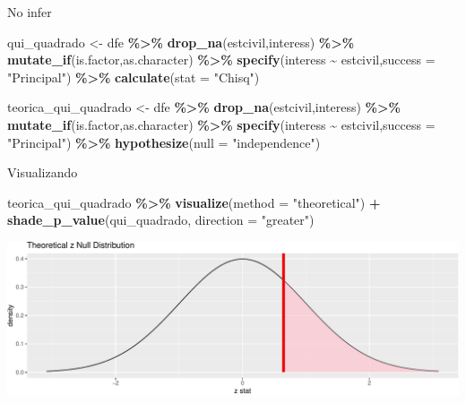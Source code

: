 \documentclass[
  9pt,
  ignorenonframetext,
  aspectratio=169]{beamer}
\newenvironment{Shaded}{\begin{snugshade}}{\end{snugshade}}
\newcommand{\DataTypeTok}[1]{\textcolor[rgb]{0.13,0.29,0.53}{#1}}
\newcommand{\KeywordTok}[1]{\textcolor[rgb]{0.13,0.29,0.53}{\textbf{#1}}}
\newcommand{\NormalTok}[1]{#1}
\newcommand{\OperatorTok}[1]{\textcolor[rgb]{0.81,0.36,0.00}{\textbf{#1}}}
\newcommand{\StringTok}[1]{\textcolor[rgb]{0.31,0.60,0.02}{#1}}
\begin{document}
\begin{frame}[fragile]{No infer}
\protect\hypertarget{no-infer}{}
\begin{Shaded}
\begin{Highlighting}[]
\NormalTok{qui\_quadrado \textless{}{-}}\StringTok{ }\NormalTok{dfe }\OperatorTok{\%\textgreater{}\%}\StringTok{ }\KeywordTok{drop\_na}\NormalTok{(estcivil,interess) }\OperatorTok{\%\textgreater{}\%}
\StringTok{   }\KeywordTok{mutate\_if}\NormalTok{(is.factor,as.character) }\OperatorTok{\%\textgreater{}\%}\StringTok{ }
\StringTok{  }\KeywordTok{specify}\NormalTok{(interess }\OperatorTok{\textasciitilde{}}\StringTok{ }\NormalTok{estcivil,}\DataTypeTok{success =} \StringTok{"Principal"}\NormalTok{) }\OperatorTok{\%\textgreater{}\%}
\StringTok{  }\KeywordTok{calculate}\NormalTok{(}\DataTypeTok{stat =} \StringTok{"Chisq"}\NormalTok{)}

\NormalTok{teorica\_qui\_quadrado \textless{}{-}}\StringTok{ }\NormalTok{dfe }\OperatorTok{\%\textgreater{}\%}\StringTok{ }\KeywordTok{drop\_na}\NormalTok{(estcivil,interess) }\OperatorTok{\%\textgreater{}\%}
\StringTok{  }\KeywordTok{mutate\_if}\NormalTok{(is.factor,as.character) }\OperatorTok{\%\textgreater{}\%}\StringTok{ }
\StringTok{  }\KeywordTok{specify}\NormalTok{(interess }\OperatorTok{\textasciitilde{}}\StringTok{ }\NormalTok{estcivil,}\DataTypeTok{success =} \StringTok{"Principal"}\NormalTok{) }\OperatorTok{\%\textgreater{}\%}
\StringTok{  }\KeywordTok{hypothesize}\NormalTok{(}\DataTypeTok{null =} \StringTok{"independence"}\NormalTok{) }
\end{Highlighting}
\end{Shaded}
\end{frame}

\begin{frame}[fragile]{Visualizando}
\protect\hypertarget{visualizando-2}{}
\begin{Shaded}
\begin{Highlighting}[]
\NormalTok{teorica\_qui\_quadrado  }\OperatorTok{\%\textgreater{}\%}
\StringTok{  }\KeywordTok{visualize}\NormalTok{(}\DataTypeTok{method =} \StringTok{"theoretical"}\NormalTok{) }\OperatorTok{+}\StringTok{ }
\StringTok{  }\KeywordTok{shade\_p\_value}\NormalTok{(qui\_quadrado,}
                \DataTypeTok{direction =} \StringTok{"greater"}\NormalTok{)}
\end{Highlighting}
\end{Shaded}

\includegraphics{aula_11_files/figure-beamer/unnamed-chunk-26-1.pdf}
\end{frame}
\end{document}
